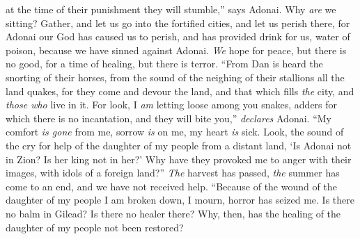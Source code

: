 \begin{biblechapter}
at the time of their punishment they will stumble,” says Adonai.
 Why \textit{are} we sitting? 
Gather, and let us go into the fortified cities, 
and let us perish there, 
for Adonai our God has caused us to perish, 
and has provided drink for us, water of poison, 
because we have sinned against Adonai.
\verse \textit{We} hope for peace, 
but there is no good, 
for a time of healing, 
but there is terror.
\verse “From Dan is heard the snorting of their horses, 
from the sound of the neighing of their stallions all the land quakes, 
for they come and devour the land, 
and that which fills \textit{the} city, 
and \textit{those who} live in it.
\verse For look, I \textit{am} letting loose among you snakes, 
adders for which there is no incantation, 
and they will bite you,” \textit{declares} Adonai.
\verse “My comfort \textit{is gone} from me, 
sorrow \textit{is} on me, 
my heart \textit{is} sick.
\verse Look, the sound of the cry for help of the daughter of my people 
from a distant land, 
‘Is Adonai not in Zion? 
Is her king not in her?’ 
Why have they provoked me to anger with their images, 
with idols of a foreign land?”
\verse \textit{The} harvest has passed, 
\textit{the} summer has come to an end, 
and we have not received help.
 “Because of the wound of the daughter of my people I am broken down, 
I mourn, horror has seized me.
\verse Is there no balm in Gilead? 
Is there no healer there? 
Why, then, has the healing of the daughter of my people not been restored?
\end{biblechapter}

